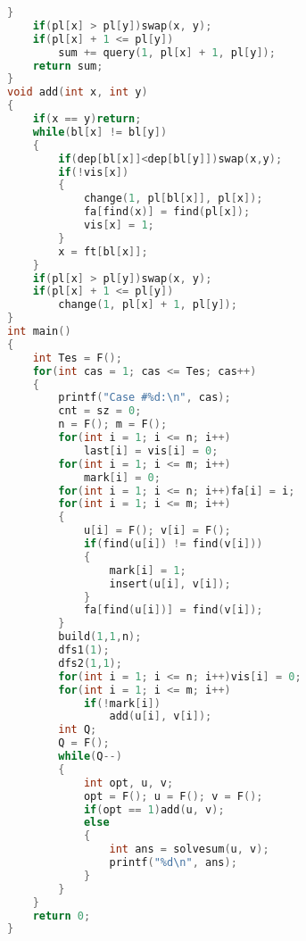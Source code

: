 \begin{lstlisting}[language=C]
    }
    if(pl[x] > pl[y])swap(x, y);    
    if(pl[x] + 1 <= pl[y])
        sum += query(1, pl[x] + 1, pl[y]);
    return sum;
}
void add(int x, int y)
{
    if(x == y)return;
    while(bl[x] != bl[y])
    {
        if(dep[bl[x]]<dep[bl[y]])swap(x,y);
        if(!vis[x])
        {
            change(1, pl[bl[x]], pl[x]);
            fa[find(x)] = find(pl[x]);
            vis[x] = 1;
        }
        x = ft[bl[x]];
    }
    if(pl[x] > pl[y])swap(x, y);    
    if(pl[x] + 1 <= pl[y])
        change(1, pl[x] + 1, pl[y]);
}
int main()
{
    int Tes = F();
    for(int cas = 1; cas <= Tes; cas++)
    {
        printf("Case #%d:\n", cas);
        cnt = sz = 0;
        n = F(); m = F();
        for(int i = 1; i <= n; i++)
            last[i] = vis[i] = 0;
        for(int i = 1; i <= m; i++)
            mark[i] = 0;
        for(int i = 1; i <= n; i++)fa[i] = i;
        for(int i = 1; i <= m; i++)
        {
            u[i] = F(); v[i] = F();
            if(find(u[i]) != find(v[i]))
            {
                mark[i] = 1;
                insert(u[i], v[i]);
            }
            fa[find(u[i])] = find(v[i]);
        }
        build(1,1,n);
        dfs1(1);
        dfs2(1,1);
        for(int i = 1; i <= n; i++)vis[i] = 0;
        for(int i = 1; i <= m; i++)
            if(!mark[i])
                add(u[i], v[i]);
        int Q;
        Q = F();
        while(Q--)
        {
            int opt, u, v;
            opt = F(); u = F(); v = F();
            if(opt == 1)add(u, v);
            else
            {
                int ans = solvesum(u, v);
                printf("%d\n", ans);
            }
        }
    }
    return 0;
}
\end{lstlisting} 
